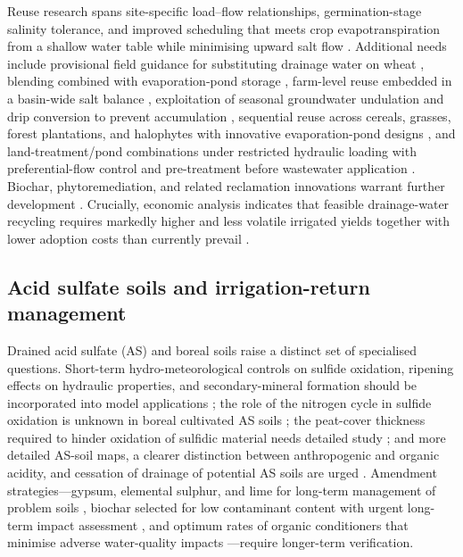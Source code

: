 \documentclass[11pt]{article}
\begin{document}
Reuse research spans site-specific load--flow relationships, germination-stage
salinity tolerance, and improved scheduling that meets crop evapotranspiration
from a shallow water table while minimising upward salt flow
\parencite{WESTCOT1988}. Additional needs include provisional field guidance for
substituting drainage water on wheat \parencite{Sharma1998}, blending combined
with evaporation-pond storage \parencite{Datta2002}, farm-level reuse embedded in
a basin-wide salt balance \parencite{Qureshi2008}, exploitation of seasonal
groundwater undulation and drip conversion to prevent accumulation
\parencite{Mirlas2021,Dou2022,Singh2019}, sequential reuse across cereals,
grasses, forest plantations, and halophytes with innovative evaporation-pond
designs \parencite{Sharma2004}, and land-treatment/pond combinations under
restricted hydraulic loading with preferential-flow control and pre-treatment
before wastewater application \parencite{Christen2010,Duan2015}. Biochar,
phytoremediation, and related reclamation innovations warrant further
development \parencite{Liu2025f,Steppuhn2017,Youngs2000}. Crucially, economic
analysis indicates that feasible drainage-water recycling requires markedly
higher and less volatile irrigated yields together with lower adoption costs
than currently prevail \parencite{Sellars2022}.

\subsection{Acid sulfate soils and irrigation-return management}

Drained acid sulfate (AS) and boreal soils raise a distinct set of specialised
questions. Short-term hydro-meteorological controls on sulfide oxidation,
ripening effects on hydraulic properties, and secondary-mineral formation should
be incorporated into model applications \parencite{Salo2023}; the role of the
nitrogen cycle in sulfide oxidation is unknown in boreal cultivated AS soils
\parencite{Virtanen2017}; the peat-cover thickness required to hinder oxidation
of sulfidic material needs detailed study \parencite{YliHalla2022}; and more
detailed AS-soil maps, a clearer distinction between anthropogenic and organic
acidity, and cessation of drainage of potential AS soils are urged
\parencite{Åström2005}. Amendment strategies---gypsum, elemental sulphur, and
lime for long-term management of problem soils \parencite{MANN1982,He2015},
biochar selected for low contaminant content with urgent long-term impact
assessment \parencite{Tian2023b}, and optimum rates of organic conditioners that
minimise adverse water-quality impacts \parencite{Zhang2015}---require
longer-term verification.
\end{document}

